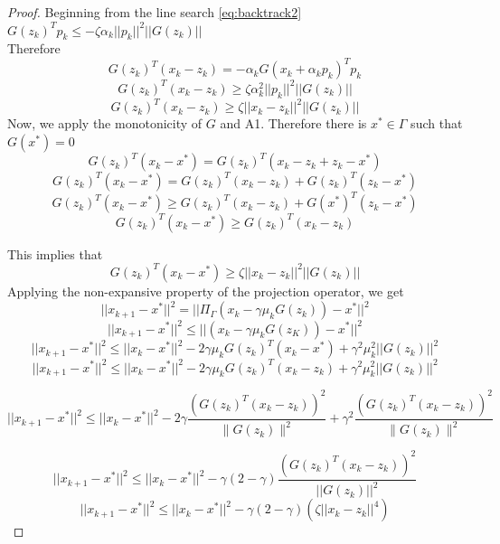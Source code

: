 \documentclass{article}
\theoremstyle{remark}
\begin{document}
{{\begin{proof}
    Beginning from the line search \eqref{eq:backtrack2} $ G(z_k)^Tp_k\leq -\zeta \alpha_k||p_k||^2||G(z_k)|| $\\ Therefore 
    \[
    G(z_k)^T(x_k-z_k)=-\alpha_kG(x_k+\alpha_kp_k)^Tp_k
    \]
    \[
    G(z_k)^T(x_k-z_k)\geq \zeta \alpha_k^2||p_k||^2||G(z_k)||
    \]
     \begin{equation}\label{cpart1}
         G(z_k)^T(x_k-z_k)\geq \zeta ||x_k-z_k||^2||G(z_k)||
     \end{equation}
 Now, we apply the monotonicity of $G$ and A1. Therefore there is $x^*\in \Gamma$ such that $G(x^*)=0$ \\
    \[
    G(z_k)^T(x_k-x^*)=G(z_k)^T(x_k-z_k+z_k-x^*)
    \]
    \[
    G(z_k)^T(x_k-x^*)=G(z_k)^T(x_k-z_k)+G(z_k)^T(z_k-x^*)
    \]
    \[
    G(z_k)^T(x_k-x^*)\geq G(z_k)^T(x_k-z_k)+G(x^*)^T(z_k-x^*)
    \]
     \begin{equation}\label{cpart2}
          G(z_k)^T(x_k-x^*)\geq G(z_k)^T(x_k-z_k)
     \end{equation}
    
    This implies that
    \begin{equation}
       G(z_k)^T(x_k-x^*)\geq \zeta ||x_k-z_k||^2||G(z_k)|| 
    \end{equation}
    Applying the non-expansive property of the projection operator, we get
    \[
   || x_{k+1}-x^*||^2=||\Pi_{\Gamma}(x_k- \gamma\mu_kG(z_k))-x^*||^2
    \]
    \[
   || x_{k+1}-x^*||^2\leq ||(x_k- \gamma\mu_kG(z_K))-x^*||^2
    \]
     \[
   || x_{k+1}-x^*||^2\leq ||x_k-x^*||^2-2 \gamma\mu_kG(z_k)^T(x_k-x^*)+\gamma^2\mu_k^2||G(z_k)||^2
    \]
     \begin{equation}\label{cconv1}
         || x_{k+1}-x^*||^2\leq ||x_k-x^*||^2- 2\gamma\mu_kG(z_k)^T(x_k-z_k)+\gamma^2\mu_k^2||G(z_k)||^2
     \end{equation}

     \begin{equation}
         || x_{k+1}-x^*||^2\leq ||x_k-x^*||^2- 2\gamma\frac{(G(z_k)^T(x_k-z_k))^2}{\|G(z_k)\|^2}+\gamma^2\frac{(G(z_k)^T(x_k-z_k))^2}{\|G(z_k)\|^2}
     \end{equation}
   
    \[
   || x_{k+1}-x^*||^2\leq ||x_k-x^*||^2-\gamma(2-\gamma) \frac{(G(z_k)^T(x_k-z_k))^2}{||G(z_k)||^2}
    \]
    \begin{equation}\label{cconv2}
        || x_{k+1}-x^*||^2\leq ||x_k-x^*||^2- \gamma(2-\gamma)(\zeta ||x_k-z_k||^4)
    \end{equation}
   

\end{proof}}}
\end{document}
